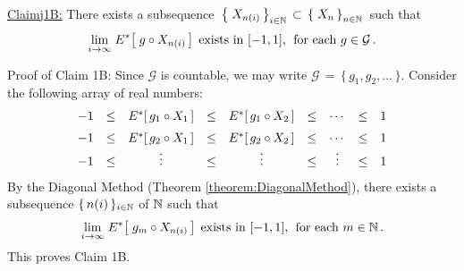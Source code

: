 \vskip 0.8cm
\begin{center}\begin{minipage}{6.5in}
\underline{Claim{{\color{white}j}}1B:}\;\;
There exists a subsequence
\,$\left\{\;X_{n(i)}\,\right\}_{i\in\mathbb{N}} \,\subset\, \left\{\;X_{n}\,\right\}_{n\in\mathbb{N}}$\,
such that %
\begin{equation*}
\underset{i\rightarrow\infty}{\lim}\; E^{*}\!\left[\;g \circ X_{n(i)}\,\right]
\;\textnormal{exists in $[-1,1]$, \;for each $g \in \mathcal{G}$}\,.
\end{equation*}
\end{minipage}\end{center}
Proof of Claim 1B:\;\;
Since $\mathcal{G}$ is countable, we may write $\mathcal{G} \,=\, \{\,g_{1},g_{2},\ldots\,\}$.
Consider the following array of real numbers:
\begin{equation*}
\begin{array}{ccccccccc}
-1 &\leq& E^{*}[\,g_{1} \circ X_{1}\,] &\leq& E^{*}[\,g_{1} \circ X_{2}\,] &\leq& \cdots &\leq& 1 \\
\overset{{\color{white}1}}{-1} &\leq& E^{*}[\,g_{2} \circ X_{1}\,] &\leq& E^{*}[\,g_{2} \circ X_{2}\,] &\leq& \cdots &\leq& 1 \\
-1 &\leq& \vdots &\leq& \vdots &\leq& \vdots &\leq& 1 \\
\end{array}
\end{equation*}
By the Diagonal Method (Theorem \ref{theorem:DiagonalMethod}),
there exists a subsequence $\{\,n(i)\,\}_{i\in\mathbb{N}}$ of $\mathbb{N}$ such that
\begin{equation*}
\underset{i\rightarrow\infty}{\lim}\; E^{*}\!\left[\;g_{m} \circ X_{n(i)}\,\right]
\;\textnormal{exists in $[-1,1]$, \;for each $m \in \mathbb{N}$}\,.
\end{equation*}
This proves Claim 1B.


